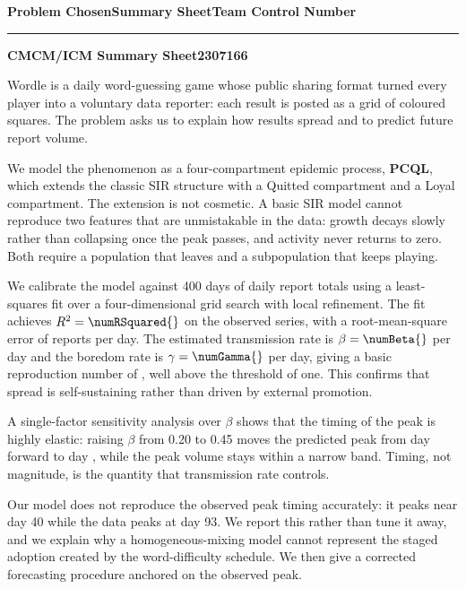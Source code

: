 \documentclass[12pt]{article}
\begin{document}
\thispagestyle{empty}
\begin{center}
\large\textbf{Problem Chosen}\hfill\textbf{Summary Sheet}\hfill\textbf{Team Control Number}\\
\rule{\textwidth}{0.4pt}
\end{center}
\begin{center}
\Large\textbf{C}\hfill\textbf{MCM/ICM Summary Sheet}\hfill\textbf{2307166}
\end{center}
\vspace{0.5em}

Wordle is a daily word-guessing game whose public sharing format turned
every player into a voluntary data reporter: each result is posted as a grid
of coloured squares. The problem asks us to explain how results spread and to
predict future report volume.

We model the phenomenon as a four-compartment epidemic process, \textbf{PCQL},
which extends the classic SIR structure with a Quitted compartment and a Loyal
compartment. The extension is not cosmetic. A basic SIR model cannot reproduce
two features that are unmistakable in the data: growth decays slowly rather
than collapsing once the peak passes, and activity never returns to zero. Both
require a population that leaves and a subpopulation that keeps playing.

We calibrate the model against 400 days of daily report totals using a
least-squares fit over a four-dimensional grid search with local refinement.
The fit achieves $R^2 = 
\numRSquared{}$ on the observed series, with a
root-mean-square error of 
\numRmse{} reports per day. The
estimated transmission rate is $\beta = 
\numBeta{}$ per day and the
boredom rate is $\gamma = 
\numGamma{}$ per day, giving a basic
reproduction number of 
\numRZero{}, well above the threshold of one.
This confirms that spread is self-sustaining rather than driven by external
promotion.

A single-factor sensitivity analysis over $\beta$ shows that the timing of the
peak is highly elastic: raising $\beta$ from 0.20 to 0.45 moves the predicted
peak from day 
\numPeakDayBetaZeroTwoZero{} forward to day 
\numPeakDayBetaZeroFourFive{},
while the peak volume stays within a narrow band. Timing, not magnitude, is
the quantity that transmission rate controls.

Our model does not reproduce the observed peak timing accurately: it peaks
near day 40 while the data peaks at day 93. We report this rather than tune it
away, and we explain why a homogeneous-mixing model cannot represent the
staged adoption created by the word-difficulty schedule. We then give a
corrected forecasting procedure anchored on the observed peak.
\end{document}
